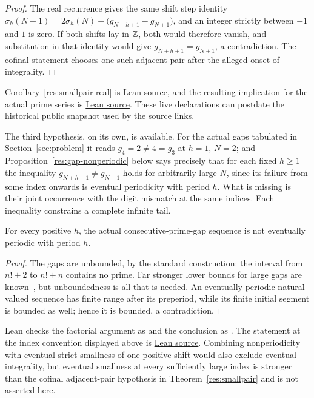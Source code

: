 \documentclass[11pt]{article}
\begin{document}
\begin{proof}
The real recurrence gives the same shift step identity
$\sigma_h(N+1)=2\sigma_h(N)-\bigl(g_{N+h+1}-g_{N+1}\bigr)$, and an integer
strictly between $-1$ and $1$ is zero.  If both shifts lay in $\mathbb{Z}$, both would
therefore vanish, and substitution in that identity would give
$g_{N+h+1}=g_{N+1}$, a contradiction.  The cofinal statement chooses one such
adjacent pair after the alleged onset of integrality.
\end{proof}

\noindent Corollary~\ref{res:smallpair-real} is
\href{https://github.com/wcook04/plectis-erdos/blob/f36a98bf3d3e6f65f1074e3b800e3293d5b8a51a/ErdosProblems/Erdos251/PaperCoreR7.lean#L282}{Lean source}, and the resulting implication for the
actual prime series is \href{https://github.com/wcook04/plectis-erdos/blob/f36a98bf3d3e6f65f1074e3b800e3293d5b8a51a/ErdosProblems/Erdos251/PaperCoreR7.lean#L298}{Lean source}.  These live
declarations can postdate the historical public snapshot used by the source
links.

The third hypothesis, on its own, is available.  For the actual gaps tabulated
in Section~\ref{sec:problem} it reads $g_4=2\ne4=g_3$ at $h=1$, $N=2$; and
Proposition~\ref{res:gap-nonperiodic} below says precisely that for each fixed
$h\ge1$ the inequality $g_{N+h+1}\ne g_{N+1}$ holds for arbitrarily large $N$,
since its failure from some index onwards is eventual periodicity with period
$h$.  What is missing is their joint occurrence with the digit mismatch at the
same indices.  Each inequality constrains a complete infinite tail.

\begin{proposition}\label{res:gap-nonperiodic}
For every positive $h$, the actual consecutive-prime-gap sequence is not
eventually periodic with period $h$.
\end{proposition}

\begin{proof}
The gaps are unbounded, by the standard construction: the interval from $n!+2$
to $n!+n$ contains no prime.  Far stronger lower bounds for large gaps are
known~\cite[Theorem~1, p.~66]{fgkmt2018}, but unboundedness is all that is
needed.  An
eventually periodic natural-valued sequence has finite range after its
preperiod, while its finite initial segment is bounded as well; hence it is
bounded, a contradiction.
\end{proof}

\noindent Lean checks the factorial argument as
 and the conclusion as
.  The statement at the index convention displayed above is
\href{https://github.com/wcook04/plectis-erdos/blob/f36a98bf3d3e6f65f1074e3b800e3293d5b8a51a/ErdosProblems/Erdos251/PaperCoreR7.lean#L175}{Lean source}.  Combining nonperiodicity with eventual strict smallness of one
positive shift would also exclude eventual integrality, but eventual
smallness at every sufficiently large index is stronger than the cofinal
adjacent-pair hypothesis in Theorem~\ref{res:smallpair} and is not asserted
here.
\end{document}
